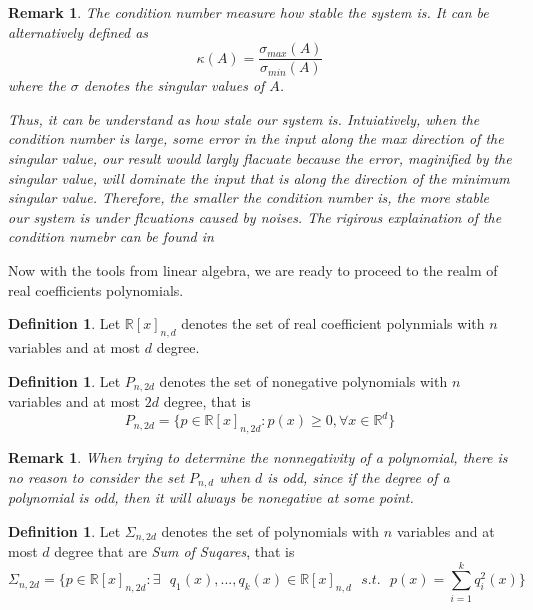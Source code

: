 \documentclass[12pt]{amsart}
\numberwithin{equation}{section}
\newtheorem{remark}[thm]{Remark}
\theoremstyle{definition}
\newtheorem{definition}[thm]{Definition}
\numberwithin{thm}{section}
\begin{document}
\begin{remark}
     The condition number measure how stable the system is. It can be alternatively defined as
     \begin{equation}
          \kappa(A) = \frac{\sigma_{max} (A)}{\sigma_{min} (A)}
     \end{equation}
     where the $\sigma$ denotes the singular values of $A$.

     Thus, it can be understand as how stale our system is. 
     Intuiatively, when the condition number is large, some error in the input along the max direction of the singular value,
     our result would largly flacuate because the error, maginified by the singular value, will dominate the input that is along
     the direction of the minimum singular value. 
     Therefore, the smaller the condition number is, the more stable our system is under flcuations caused by noises.
     The rigirous explaination of the condition numebr can be found in \cite{Cheney:Kincaid}
\end{remark}

\smallskip

Now with the tools from linear algebra, we are ready to proceed to the realm of real coefficients polynomials.

\begin{definition}
     Let $\mathbb{R}[x]_{n,d}$ denotes the set of real coefficient 
     polynmials with $n$ variables and at most $d$ degree.
\end{definition}

\begin{definition}
     \label{def:NGP}
     Let $P_{n, 2d}$ denotes the set of nonegative polynomials with 
     $n$ variables and at most $2d$ degree, that is 
     \begin{equation}
          P_{n, 2d} = \{ p \in \mathbb{R}[x]_{n, 2d}: p(x) \geq 0, \forall x \in \mathbb{R}^d \}
     \end{equation}
\end{definition}

\begin{remark}
     When trying to determine the nonnegativity of a polynomial, there is no reason to consider the set $P_{n, d}$ when $d$ is odd, since if the 
     degree of a polynomial is odd, then it will always be nonegative at some point.
\end{remark}

\begin{definition}
\label{def:SOS}
     Let $\Sigma_{n,2d}$ denotes the set of polynomials with $n$ variables and at most
     $d$ degree that are \emph{Sum of Suqares}, that is
     \begin{equation}
          \Sigma_{n, 2d} = \{ p \in \mathbb{R}[x]_{n, 2d}: \exists \text{ } q_1(x), ..., q_k(x) \in \mathbb{R}[x]_{n,d} \text{ } s.t. \text{ }  p(x) = \sum_{i=1}^k q_i^2(x)\}
     \end{equation}     
\end{definition}
\end{document}
